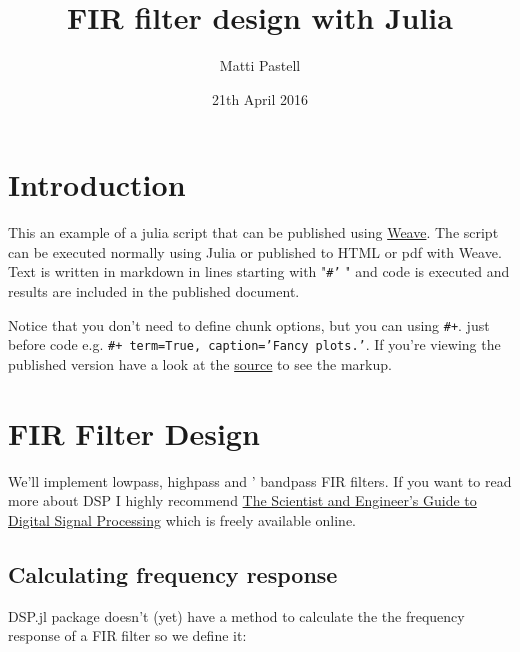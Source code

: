\documentclass[12pt,a4paper]{article}
\title{ FIR filter design with Julia }
\author{ Matti Pastell }
\date{ 21th April 2016 }
\begin{document}
\maketitle

\section{Introduction}
This an example of a julia script that can be published using \href{http://mpastell.github.io/Weave.jl/latest/usage/}{Weave}. The script can be executed normally using Julia or published to HTML or pdf with Weave. Text is written in markdown in lines starting with "\texttt{\#'} " and code is executed and results are included in the published document.

Notice that you don't need to define chunk options, but you can using \texttt{\#+}. just before code e.g. \texttt{\#+ term=True, caption='Fancy plots.'}. If you're viewing the published version have a look at the \href{FIR_design_plots.jl}{source} to see the markup.

\section{FIR Filter Design}
We'll implement lowpass, highpass and ' bandpass FIR filters. If you want to read more about DSP I highly recommend \href{http://www.dspguide.com/}{The Scientist and Engineer's Guide to Digital Signal Processing} which is freely available online.

\subsection{Calculating frequency response}
DSP.jl package doesn't (yet) have a method to calculate the the frequency response of a FIR filter so we define it:
\end{document}
